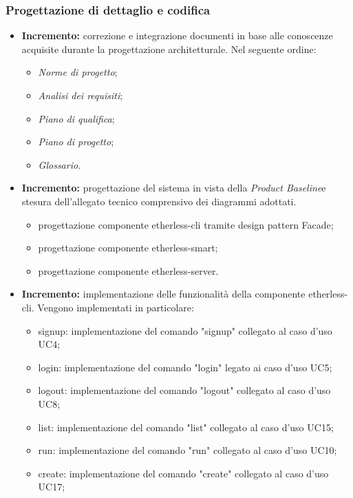 \subsubsection{Progettazione di dettaglio e codifica}
\begin{itemize}
	\item \textbf{ Incremento:} correzione e integrazione documenti in base alle conoscenze acquisite durante la progettazione architetturale. Nel seguente ordine:
  \begin{itemize}
    \item \textit{Norme di progetto}\docs;
    \item \textit{Analisi dei requisiti}\docs;
    \item \textit{Piano di qualifica}\docs;
    \item \textit{Piano di progetto}\docs;
    \item \textit{Glossario}\docs.
  \end{itemize}
	\item \textbf{ Incremento:} progettazione del sistema in vista della \textit{Product Baseline}\glo e stesura dell'allegato tecnico comprensivo dei diagrammi adottati.
	\begin{itemize}
		\item progettazione componente etherless-cli tramite design pattern Facade;
		\item progettazione componente etherless-smart;
		\item progettazione componente etherless-server.
	\end{itemize}
	\item \textbf{ Incremento:} implementazione delle funzionalità della componente etherless-cli.
  Vengono implementati in particolare:
  \begin{itemize}
  	\item signup: implementazione del comando "signup" collegato al caso d'uso UC4;
    \item login: implementazione del comando "login" legato ai caso d'uso UC5;
    \item logout: implementazione del comando "logout" collegato al caso d'uso UC8;
    \item list: implementazione del comando "list" collegato al caso d'uso UC15;
    \item run: implementazione del comando "run" collegato al caso d'uso UC10;
    \item create: implementazione del comando "create" collegato al caso d'uso UC17;

\end{itemize}
\end{itemize}
